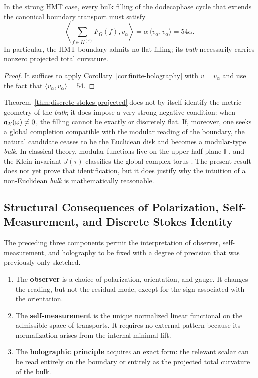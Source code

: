 \begin{corollary}\label{cor:hmt-bulk-curvature}
In the strong HMT case, every bulk filling of the dodecaphase cycle that extends the canonical
boundary transport must satisfy
\[
\left\langle \sum_{f\in K^{(2)}}F_\Omega(f),v_\alpha\right\rangle
=
\alpha\,\langle v_\alpha,v_\alpha\rangle
=
54\alpha.
\]
In particular, the HMT boundary admits no flat filling; its \emph{bulk} necessarily carries nonzero
projected total curvature.
\end{corollary}

\begin{proof}
It suffices to apply Corollary~\ref{cor:finite-holography} with $v=v_\alpha$ and use the fact that
$\langle v_\alpha,v_\alpha\rangle=54$.
\end{proof}



\begin{remark}
Theorem~\ref{thm:discrete-stokes-projected} does not by itself identify the metric geometry of the \emph{bulk}; it does impose a very strong negative condition: when $\mathfrak a_\mathcal X(\omega)\neq 0$, the filling cannot be exactly or discretely flat. If, moreover, one seeks a global completion compatible with the modular reading of the boundary, the natural candidate ceases to be the Euclidean disk and becomes a modular-type \emph{bulk}. In classical theory, modular functions live on the upper half-plane $\mathbb H$, and the Klein invariant $J(\tau)$ classifies the global complex torus \cite{DLMFModular}. The present result does not yet prove that identification, but it does justify why the intuition of a non-Euclidean \emph{bulk} is mathematically reasonable.
\end{remark}

\subsection{Structural Consequences of Polarization, Self-Measurement, and Discrete Stokes Identity}

The preceding three components permit the interpretation of observer, self-measurement, and holography to be fixed with a degree of precision that was previously only sketched.

\begin{enumerate}[label=\textup{(\arabic*)}]
\item The \textbf{observer} is a choice of polarization, orientation, and gauge. It changes the reading,
but not the residual mode, except for the sign associated with the orientation.
\item The \textbf{self-measurement} is the unique normalized linear functional on the admissible space of
transports. It requires no external pattern because its normalization arises from the internal minimal lift.
\item The \textbf{holographic
principle} acquires an exact form: the relevant scalar can be read
entirely on the boundary or entirely as the projected total curvature of
the bulk.
\end{enumerate}

